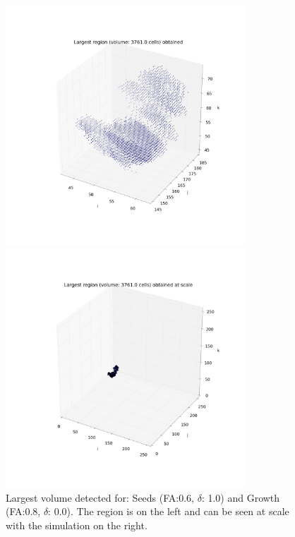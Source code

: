 \documentclass[12pt]{article}
\begin{document}
\begin{figure}[ht]
\centering
\begin{minipage}{.5\textwidth}
  \centering
  \includegraphics[width=0.8\textwidth]{groups/firstimplementation/largest_vol_24_seeds_129.png} %
\end{minipage}%
\begin{minipage}{.5\textwidth}
  \centering
  \includegraphics[width=0.8\textwidth]{groups/firstimplementation/largest_vol_24_seeds_129_scale.png}
  \end{minipage}
\caption{Largest volume detected for: Seeds (FA:0.6, $\delta$: 1.0) and Growth (FA:0.8, $\delta$: 0.0). The region is on the left and can be seen at scale with the simulation on the right.}
\label{fg:first_3D_largest}
\end{figure}
\FloatBarrier
\end{document}
